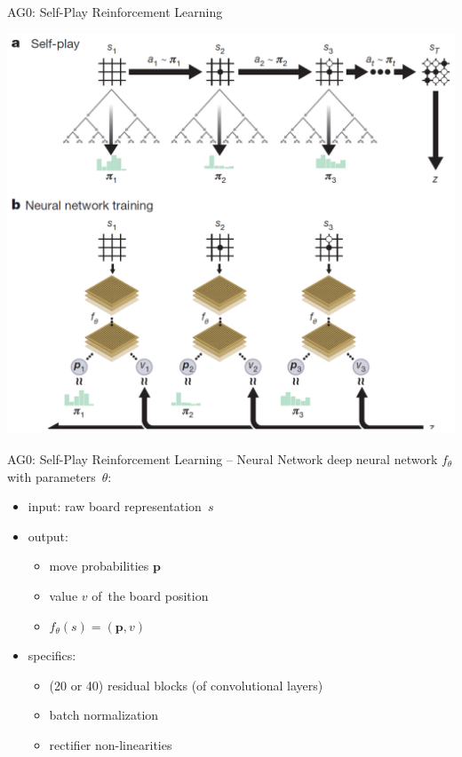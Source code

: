 \documentclass{beamer}
\newcommand{\p}{\mathbf{p}}
\begin{document}
{    \begin{frame}{AG0: Self-Play Reinforcement Learning}
      \pause
      \begin{center}
        \includegraphics[height=.9\textheight]{../img/AG0-paper/self-play-RL-in-AG0.png}
      \end{center}
    \end{frame}

    \begin{frame}{AG0: Self-Play Reinforcement Learning -- Neural Network}
      deep neural network $f_\theta$ with parameters~$\theta$:
      \pause
      \begin{itemize}[<+- | alert@+>]
        \item input: raw board representation~$s$
        \item output:
          \begin{itemize}[<+- | alert@+>]
            \item move probabilities $\p$
            \item value $v$ of~the board position
            \item $f_\theta(s) = (\p, v)$
          \end{itemize}
        \item specifics:
          \begin{itemize}[<+- | alert@+>]
            \item (20 or 40) residual blocks (of convolutional layers)
            \item batch normalization
            \item rectifier non-linearities
          \end{itemize}
      \end{itemize}
    \end{frame}

}
\end{document}
